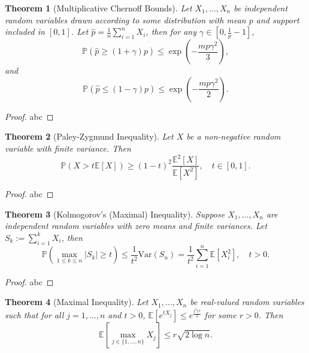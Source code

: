 \documentclass[openany,12pt]{book}
\newtheorem{theorem}{Theorem}[chapter]
\begin{document}
\begin{theorem}[Multiplicative Chernoff Bounds]
  Let $X_1,\dots,X_n$ be independent random variables drawn according to some distribution with mean $p$ and support included in $[0, 1]$. Let $\hat{p}=\frac{1}{n}\sum_{i=1}^{n}X_i$, then for any $\gamma\in[0, \frac{1}{p}-1]$,
  \begin{equation}
    \mathbb{P}(\hat{p}\geqslant(1+\gamma)p)\leqslant\exp\left(-\frac{mp\gamma^2}{3}\right),
  \end{equation}
  and
  \begin{equation}
    \mathbb{P}(\hat{p}\leqslant(1-\gamma)p)\leqslant\exp\left(-\frac{mp\gamma^2}{2}\right).
  \end{equation}
\end{theorem}

\begin{proof}
  abc
\end{proof}

\begin{theorem}[Paley-Zygmund Inequality]
  Let $X$ be a non-negative random variable with finite variance. Then
  \begin{equation}
    \mathbb{P}(X>t\mathbb{E}[X])\geqslant(1-t)^2\frac{\mathbb{E}^2[X]}{\mathbb{E}[X^2]},\quad t\in[0,1].
  \end{equation}
\end{theorem}

\begin{proof}
  abc
\end{proof}

\begin{theorem}[Kolmogorov's (Maximal) Inequality]
  Suppose $X_1,\dots,X_n$ are independent random variables with zero means and finite variances. Let $S_k:=\sum_{i=1}^{k}X_i$, then
  \begin{equation}
    \mathbb{P}\left(\max_{1\leqslant k\leqslant n}|S_k|\geqslant t\right)\leqslant\frac{1}{t^2}\mathrm{Var}(S_n)=\frac{1}{t^2}\sum_{i=1}^{n}\mathbb{E}[X_i^2],\quad t>0.
  \end{equation}
\end{theorem}

\begin{proof}
  abc
\end{proof}

\begin{theorem}[Maximal Inequality]
  Let $X_1,\dots,X_n$ be real-valued random variables such that for all $j=1,\dots,n$ and $t>0$, $\mathbb{E}[e^{tX_j}]\leqslant e^{\frac{t^2r^2}{2}}$ for some $r>0$. Then
  \begin{equation}
    \mathbb{E}\left[\max_{j\in\{1,\dots,n\}}X_j\right]\leqslant r\sqrt{2\log n}.
  \end{equation}
\end{theorem}
\end{document}
